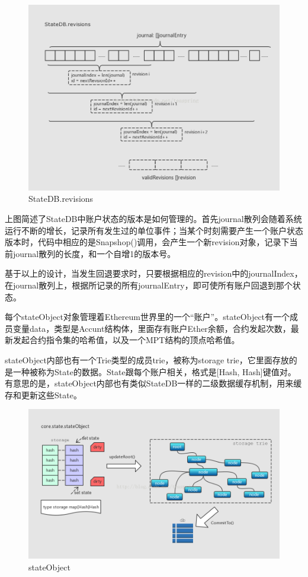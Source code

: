 \documentclass[UTF8]{ctexart}
\begin{document}
\begin{figure}
	\centering
	\includegraphics[scale=0.4]{statedb3.png}
	\caption{StateDB.revisions}
	\label{statedb3}
\end{figure}

上图简述了StateDB中账户状态的版本是如何管理的。首先journal散列会随着系统运行不断的增长，记录所有发生过的单位事件；当某个时刻需要产生一个账户状态版本时，代码中相应的是Snapshop()调用，会产生一个新revision对象，记录下当前journal散列的长度，和一个自增1的版本号。

基于以上的设计，当发生回退要求时，只要根据相应的revision中的journalIndex，在journal散列上，根据所记录的所有journalEntry，即可使所有账户回退到那个状态。


每个stateObject对象管理着Ethereum世界里的一个“账户”。stateObject有一个成员变量data，类型是Accunt结构体，里面存有账户Ether余额，合约发起次数，最新发起合约指令集的哈希值，以及一个MPT结构的顶点哈希值。

stateObject内部也有一个Trie类型的成员trie，被称为storage trie，它里面存放的是一种被称为State的数据。State跟每个账户相关，格式是[Hash, Hash]键值对。有意思的是，stateObject内部也有类似StateDB一样的二级数据缓存机制，用来缓存和更新这些State。

\begin{figure}
	\centering
	\includegraphics[scale=0.35]{stateObject.png}
	\caption{stateObject}
	\label{stateObject}
\end{figure}
\end{document}
